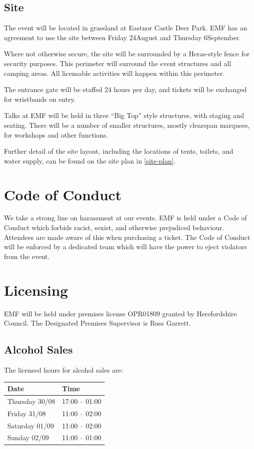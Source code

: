 \subsection{Site}
The event will be located in grassland at Eastnor Castle Deer Park. EMF has an
agreement to use the site between Friday 24\th August and Thursday
6\th September.

Where not otherwise secure, the site will be surrounded by a Heras-style fence
for security purposes.  This perimeter will surround the event structures and all
camping areas. All licensable activities will happen within this perimeter.

The entrance gate will be staffed 24 hours per day, and tickets will be
exchanged for wristbands on entry.

Talks at EMF will be held in three ``Big Top'' style structures, with staging and
seating. There will be a number of smaller structures, mostly clearspan marquees,
for workshops and other functions.

Further detail of the site layout, including the locations of tents, toilets,
and water supply, can be found on the site plan in \cref{site-plan}.

\section{Code of Conduct}

We take a strong line on harassment at our events. EMF is held under a
Code of Conduct which forbids racist, sexist, and otherwise prejudiced behaviour.
Attendees are made aware of this when purchasing a ticket. The Code of Conduct
will be enforced by a dedicated team which will have the power to eject violators
from the event.

\newpage

\section{Licensing}

EMF will be held under premises license OPR01809 granted by Herefordshire Council.
The Designated Premises Supervisor is Russ Garrett.

\subsection{Alcohol Sales}

The licensed hours for alcohol sales are:

\begin{table}[h!]
    \centering
    \begin{tabular}{| l l |}
        \hline
        \textbf{Date} & \textbf{Time} \\
        \hline
        Thursday 30/08 & 17:00 -- 01:00 \\
        Friday 31/08 & 11:00 -- 02:00 \\
        Saturday 01/09 & 11:00 -- 02:00 \\
        Sunday 02/09 & 11:00 -- 01:00 \\
        \hline
    \end{tabular}
    \centering
\end{table}

